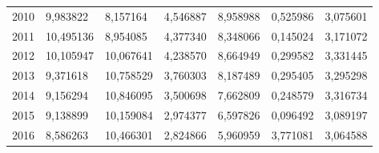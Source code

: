 \begin{table}
\begin{tabular}{p{1cm}p{2cm}p{2cm}p{2cm}p{2cm}p{2cm}p{2cm}}
 2010 &                        9,983822 &                      8,157164 &         4,546887 &                                      8,958988 &                      0,525986 &      3,075601 \\
 2011 &                       10,495136 &                      8,954085 &         4,377340 &                                      8,348066 &                      0,145024 &      3,171072 \\
 2012 &                       10,105947 &                     10,067641 &         4,238570 &                                      8,664949 &                      0,299582 &      3,331445 \\
 2013 &                        9,371618 &                     10,758529 &         3,760303 &                                      8,187489 &                      0,295405 &      3,295298 \\
 2014 &                        9,156294 &                     10,846095 &         3,500698 &                                      7,662809 &                      0,248579 &      3,316734 \\
 2015 &                        9,138899 &                     10,159084 &         2,974377 &                                      6,597826 &                      0,096492 &      3,089197 \\
 2016 &                        8,586263 &                     10,466301 &         2,824866 &                                      5,960959 &                      3,771081 &      3,064588 \\
\bottomrule
\end{tabular}
\end{table}
